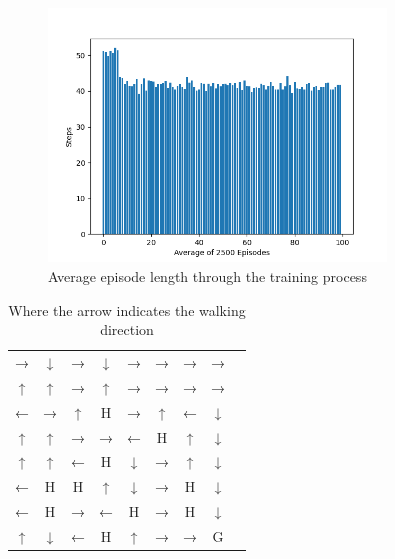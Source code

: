 \documentclass{article}
\begin{document}
\begin{figure}[H]
\centering
\includegraphics[width=0.8\textwidth]{images/avg_episode_length.png}
\caption{Average episode length through the training process}
\label{fig:avg}
\end{figure}

\begin{table}[H]
    \centering
    \begin{tabular}{ccccccccc}
        →& ↓& →& ↓& →& →& →& → \\
        ↑& ↑& →& ↑& →& →& →& → \\
        ←& →& ↑& H& →& ↑& ←& ↓ \\
        ↑& ↑& →& →& ←& H& ↑& ↓ \\
        ↑& ↑& ←& H& ↓& →& ↑& ↓ \\
        ←& H& H& ↑& ↓& →& H& ↓ \\
        ←& H& →& ←& H& →& H& ↓ \\
        ↑& ↓& ←& H& ↑& →& →& G 
    \end{tabular}
\caption{Where the arrow indicates the walking direction}
\label{tab:policy}
\end{table}
\end{document}
